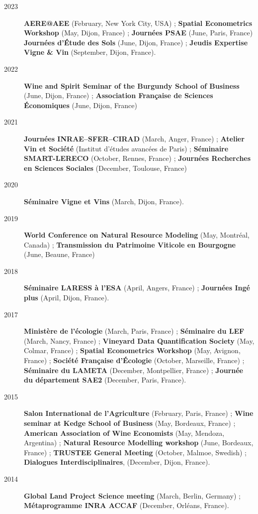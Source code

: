 \documentclass[11pt, a4paper]{./style}
\begin{document}
\begin{description}
\item[{2023}] \textbf{AERE@AEE} (February, New York City, USA) ; \textbf{Spatial
Econometrics Workshop} (May, Dijon, France) ; \textbf{Journées PSAE}
(June, Paris, France) \textbf{Journées d'Étude des Sols} (June, Dijon,
France) ; \textbf{Jeudis Expertise Vigne \& Vin} (September, Dijon,
France).
\item[{2022}] \textbf{Wine and Spirit Seminar of the Burgundy School of
Business} (June, Dijon, France) ; \textbf{Association Française de
Sciences Économiques} (June, Dijon, France)
\item[{2021}] \textbf{Journées INRAE--SFER--CIRAD} (March, Anger, France) ;
\textbf{Atelier Vin et Société} (Institut d’études avancées de Paris) ;
\textbf{Séminaire SMART-LERECO} (October, Rennes, France) ; \textbf{Journées
Recherches en Sciences Sociales} (December, Toulouse, France)
\item[{2020}] \textbf{Séminaire Vigne et Vins} (March, Dijon, France).
\item[{2019}] \textbf{World Conference on Natural Resource Modeling} (May,
Montréal, Canada) ; \textbf{Transmission du Patrimoine Viticole en
Bourgogne} (June, Beaune, France)
\item[{2018}] \textbf{Séminaire LARESS à l'ESA} (April, Angers, France) ;
\textbf{Journées Ingé plus} (April, Dijon, France).
\item[{2017}] \textbf{Ministère de l'écologie} (March, Paris, France) ;
\textbf{Séminaire du LEF} (March, Nancy, France) ; \textbf{Vineyard Data
Quantification Society} (May, Colmar, France) ; \textbf{Spatial
Econometrics Workshop} (May, Avignon, France) ; \textbf{Société Française
d'Écologie} (October, Marseille, France) ; \textbf{Séminaire du LAMETA}
(December, Montpellier, France) ; \textbf{Journée du département SAE2}
(December, Paris, France).
\item[{2015}] \textbf{Salon International de l'Agriculture} (February, Paris,
France) ; \textbf{Wine seminar at Kedge School of Business} (May,
Bordeaux, France) ; \textbf{American Association of Wine Economists}
(May, Mendoza, Argentina) ; \textbf{Natural Resource Modelling workshop}
(June, Bordeaux, France) ; \textbf{TRUSTEE General Meeting} (October,
Malmoe, Swedish) ; \textbf{Dialogues Interdisciplinaires}, (December,
Dijon, France).
\item[{2014}] \textbf{Global Land Project Science meeting} (March, Berlin,
Germany) ; \textbf{Métaprogramme INRA ACCAF} (December, Orléans, France).

\end{description}
\end{document}
